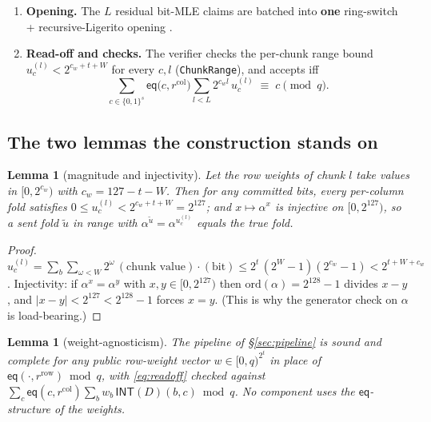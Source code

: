 \documentclass[11pt]{article}
\newcommand{\bits}{\{0,1\}}
\newcommand{\INT}{\mathsf{INT}}
\newcommand{\mle}[1]{\widetilde{#1}}
\newcommand{\eq}{\mathsf{eq}}
\newcommand{\cw}{c_w}
\newcommand{\orda}{\mathrm{ord}}
\DeclareRobustCommand{\code}[1]{{\def\_{\textunderscore\allowbreak}\texttt{#1}}}
\theoremstyle{plain}
\newtheorem{lemma}[theorem]{Lemma}
\theoremstyle{definition}
\theoremstyle{remark}
\begin{document}
\begin{enumerate}[leftmargin=1.8em,itemsep=2pt]
  \code{q\_rowbit} table, $m_\xi$ the $\xi$-combined rows). Its fresh
  challenges $r^{*(l)}$ leave the \emph{committed bit-MLE claim}
  $\mle{D}(r^{*(l)},\xi^{(l)})=\mu^{(l)}$; the verifier's only
  $O(2^{t}W)$ step is evaluating $\mle{R^{(l)}}(r^{*(l)})$.
\item \textbf{Opening.} The $L$ residual bit-MLE claims are batched into
  \textbf{one} ring-switch + recursive-Ligerito opening \cite{Flock,DP24}.
\item \textbf{Read-off and checks.} The verifier checks the per-chunk range
  bound $u_c^{(l)} < 2^{\cw+t+W}$ for every $c,l$ (\code{ChunkRange}), and
  accepts iff
  \begin{equation}\label{eq:readoff}
    \sum_{c\in\bits^{s}} \eq\bigl(c,r^{\mathrm{col}}\bigr)
      \sum_{l<L} 2^{\cw l}\, u_c^{(l)}
    \;\equiv\; c \pmod q .
  \end{equation}
\end{enumerate}

\subsection{The two lemmas the construction stands on}

\begin{lemma}[magnitude and injectivity]\label{lem:inject}
Let the row weights of chunk $l$ take values in $[0,2^{\cw})$ with
$\cw = 127-t-W$. Then for any committed bits, every per-column fold satisfies
$0\le u_c^{(l)} < 2^{\cw+t+W} = 2^{127}$; and $x\mapsto\alpha^{x}$ is injective
on $[0,2^{127})$, so a sent fold $\tilde u$ in range with
$\alpha^{\tilde u}=\alpha^{u_c^{(l)}}$ equals the true fold.
\end{lemma}

\begin{proof}
$u_c^{(l)} = \sum_{b}\sum_{\omega<W} 2^{\omega}\,(\text{chunk value})\cdot(\text{bit})
\le 2^{t}\,(2^{W}-1)(2^{\cw}-1) < 2^{t+W+\cw}$. Injectivity: if
$\alpha^{x}=\alpha^{y}$ with $x,y\in[0,2^{127})$ then
$\orda(\alpha)=2^{128}-1$ divides $x-y$, and $|x-y|<2^{127}<2^{128}-1$ forces
$x=y$. (This is why the generator check on $\alpha$ is load-bearing.)
\end{proof}

\begin{lemma}[weight-agnosticism]\label{lem:agnostic}
The pipeline of \S\ref{sec:pipeline} is sound and complete for \emph{any}
public row-weight vector $w\in[0,q)^{2^{t}}$ in place of
$\eq(\cdot,r^{\mathrm{row}})\bmod q$, with \eqref{eq:readoff} checked against
$\sum_c \eq(c,r^{\mathrm{col}})\sum_b w_b\,\INT(D)(b,c) \bmod q$. No component
uses the $\eq$-structure of the weights.
\end{lemma}
\end{document}
